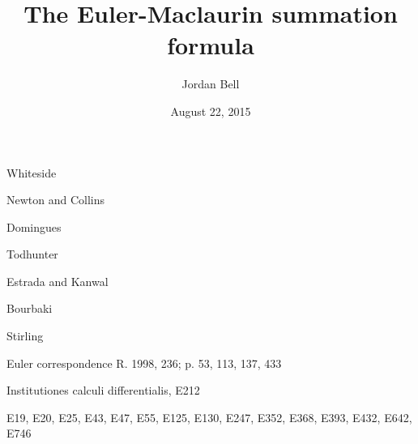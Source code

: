 \documentclass{article}
\begin{document}
\title{The Euler-Maclaurin summation formula}
\author{Jordan Bell}
\date{August 22, 2015}

\maketitle

Whiteside \cite[pp.~44, 257]{whitesideVIII}

Newton and Collins \cite[pp.~186, 199]{bourbaki}

Domingues \cite[p.~44]{domingues}

Todhunter \cite[p.~192]{todhunter}

Estrada and Kanwal \cite[p.~36]{estrada}

Bourbaki \cite[Chapter VI]{bourbaki}

\cite[pp.~45, 160, 337, 475, 531]{commerciumII}

\cite[pp.~XL--XLIX]{I9}

Stirling \cite[p.~274]{tweddle2003}

Euler correspondence R. 1998, 236; p. 53, 113, 137, 433

Institutiones calculi differentialis, E212

E19, E20, E25, E43, E47, E55, E125, E130, E247, E352, E368, E393, E432, E642, E746

\nocite{*}



\end{document}
